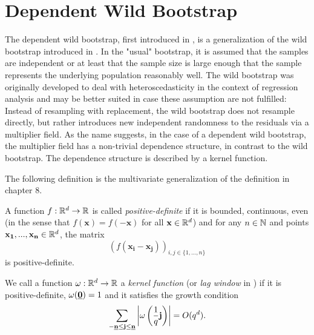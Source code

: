 \section{Dependent Wild Bootstrap}

The dependent wild bootstrap, first introduced in \cite{[46]shao2010dwb}, is a generalization of the wild bootstrap introduced in \cite{[53]wu1986}. In the "usual" bootstrap, it is assumed that the samples are independent or at least that the sample size is large enough that the sample represents the underlying population reasonably well. The wild bootstrap was originally developed to deal with heteroscedasticity in the context of regression analysis and may be better suited in case these assumption are not fulfilled: Instead of resampling with replacement, the wild bootstrap does not resample directly, but rather introduces new independent randomness to the residuals via a multiplier field. As the name suggests, in the case of a dependent wild bootstrap, the multiplier field has a non-trivial dependence structure, in contrast to the wild bootstrap. The dependence structure is described by a kernel function.

The following definition is the multivariate generalization of the definition in \cite{bochner1933monotone} chapter 8.
\begin{defn}
    A function $f: \mathbb{R}^d \to \mathbb{R}$ is called \textit{positive-definite} if it is bounded, continuous, even (in the sense that $f(\mathbf{x}) = f(-\mathbf{x})$ for all $\mathbf{x} \in \mathbb{R}^d$) and for any $n \in \mathbb{N}$ and points $\mathbf{x_1}, ..., \mathbf{x_n} \in \mathbb{R}^d$, the matrix
    \begin{equation*}
        (f(\mathbf{x_i} - \mathbf{x_j}))_{i, j \in \{1, ..., n\}}
    \end{equation*}
    is positive-definite.
\end{defn}

\begin{defn}
    We call a function $\omega: \mathbb{R}^d \to \mathbb{R}$ a \textit{kernel function} (or \textit{lag window} in \cite{brockwell1991time}) if it is positive-definite, $\omega(\usbf[0])=1$ and it satisfies the growth condition
    \begin{equation} \label{growth condition kernel function}
        \sum\limits_{-\usbf[n] \leq \mathbf{j} \leq \usbf[n]} \left| \omega\left(\frac{1}{q} \mathbf{j}\right) \right| = O(q^d).
    \end{equation}
\end{defn}

